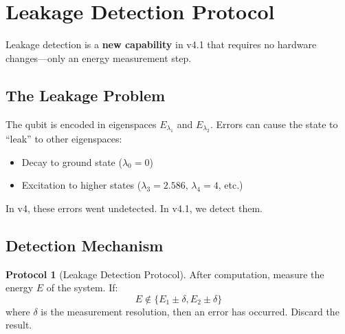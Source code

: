 \documentclass[11pt,a4paper]{article}
\theoremstyle{definition}
\newtheorem{protocol}[theorem]{Protocol}
\begin{document}
\section{Leakage Detection Protocol}

\begin{newresult}
Leakage detection is a \textbf{new capability} in v4.1 that requires no hardware changes---only an energy measurement step.
\end{newresult}

\subsection{The Leakage Problem}

The qubit is encoded in eigenspaces $E_{\lambda_1}$ and $E_{\lambda_2}$. Errors can cause the state to ``leak'' to other eigenspaces:
\begin{itemize}[noitemsep]
    \item Decay to ground state ($\lambda_0 = 0$)
    \item Excitation to higher states ($\lambda_3 = 2.586$, $\lambda_4 = 4$, etc.)
\end{itemize}

In v4, these errors went undetected. In v4.1, we detect them.

\subsection{Detection Mechanism}

\begin{protocol}[Leakage Detection Protocol]
After computation, measure the energy $E$ of the system. If:
\begin{equation}
E \notin \{E_1 \pm \delta, E_2 \pm \delta\}
\end{equation}
where $\delta$ is the measurement resolution, then an error has occurred. Discard the result.
\end{protocol}
\end{document}
